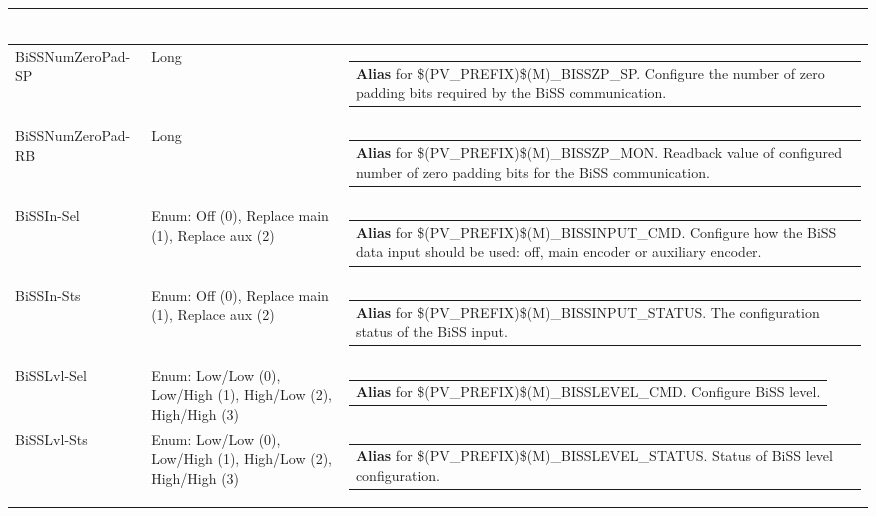 \documentclass[openany]{article}
\begin{document}
\begin{longtable}{| m{4.5cm} m{2.5cm}  m{8.5cm} |}
\begin{tabular}{@{}m{6cm}@{}}
            \end{tabular} \hypertarget{pv:biss-num-zero-pad}{}\\ \hline
        BiSSNumZeroPad-SP & Long & \begin{tabular}{@{}m{6cm}@{}}
                \textbf{\color{blue} Alias} for \$(PV\_PREFIX)\$(M)\_BISSZP\_SP. Configure the number of zero padding bits required by the BiSS communication.
            \end{tabular} \hypertarget{}{}\\ \hline
        BiSSNumZeroPad-RB & Long & \begin{tabular}{@{}m{6cm}@{}}
                \textbf{\color{blue} Alias} for \$(PV\_PREFIX)\$(M)\_BISSZP\_MON. Readback value of configured number of zero padding bits for the BiSS communication.
            \end{tabular} \hypertarget{pv:biss-in}{}\\ \hline
        BiSSIn-Sel & Enum: Off (0), Replace main (1), Replace aux (2) & \begin{tabular}{@{}m{6cm}@{}}
                \textbf{\color{blue} Alias} for \$(PV\_PREFIX)\$(M)\_BISSINPUT\_CMD. Configure how the BiSS data input should be used: off, main encoder or auxiliary encoder.
            \end{tabular} \hypertarget{}{}\\ \hline
        BiSSIn-Sts & Enum: Off (0), Replace main (1), Replace aux (2) & \begin{tabular}{@{}m{6cm}@{}}
                \textbf{\color{blue} Alias} for \$(PV\_PREFIX)\$(M)\_BISSINPUT\_STATUS. The configuration status of the BiSS input.
            \end{tabular} \hypertarget{pv:biss-lvl}{}\\ \hline
        BiSSLvl-Sel & Enum: Low/Low (0), Low/High (1), High/Low (2), High/High (3) & \begin{tabular}{@{}m{6cm}@{}}
                \textbf{\color{blue} Alias} for \$(PV\_PREFIX)\$(M)\_BISSLEVEL\_CMD. Configure BiSS level.
            \end{tabular} \hypertarget{}{}\\ \hline
        BiSSLvl-Sts & Enum: Low/Low (0), Low/High (1), High/Low (2), High/High (3) & \begin{tabular}{@{}m{6cm}@{}}
                \textbf{\color{blue} Alias} for \$(PV\_PREFIX)\$(M)\_BISSLEVEL\_STATUS. Status of BiSS level configuration.

\end{tabular}
\end{longtable}
\end{document}
